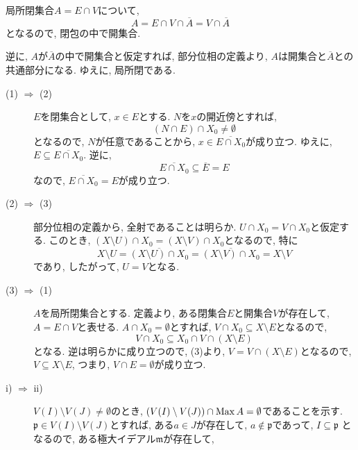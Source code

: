 \documentclass[dvipdfmx]{jsarticle}
\begin{document}
    \begin{problem}
        局所閉集合$A = E \cap V$について,
        \[
            A = E \cap V \cap \overline{A} = V \cap \overline{A}
        \]
        となるので, 閉包の中で開集合.

        逆に, $A$が$\overline{A}$の中で開集合と仮定すれば, 部分位相の定義より, $A$は開集合と$\overline{A}$との共通部分になる.
        ゆえに, 局所閉である.
        \begin{description}
            \item[(1) $\Rightarrow$ (2)]
            $E$を閉集合として, $x \in E$とする.
            $N$を$x$の開近傍とすれば,
            \[
                (N \cap E) \cap X_0 \neq \emptyset
            \]
            となるので, $N$が任意であることから,
            $x \in \overline{E \cap X_0}$が成り立つ.
            ゆえに, $E \subseteq \overline{E \cap X_0}$.
            逆に,
            \[
                \overline{E \cap X_0} \subseteq \overline{E} = E
            \]
            なので, $\overline{E \cap X_0} = E$が成り立つ.
            \item [(2) $\Rightarrow$ (3)]
            部分位相の定義から, 全射であることは明らか.
            $U \cap X_0 = V \cap X_0$と仮定する.
            このとき,
            $(X \setminus U) \cap X_0 = (X \setminus V) \cap X_0$となるので,
            特に
            \[
                X \setminus U = \overline{(X \setminus U) \cap X_0} = \overline{(X \setminus V) \cap X_0} = X \setminus V
            \]
            であり,
            したがって, $U = V$となる.
            \item [(3) $\Rightarrow$ (1)]
            $A$を局所閉集合とする.
            定義より, ある閉集合$E$と開集合$V$が存在して, $A = E \cap V$と表せる.
            $A \cap X_0 = \emptyset$とすれば,
            $V \cap X_0 \subseteq X \setminus E$となるので,
            \[
                V \cap X_0 \subseteq X_0 \cap V \cap (X \setminus E)
            \]
            となる.
            逆は明らかに成り立つので,
            (3)より, $V = V \cap (X \setminus E)$となるので,
            $V \subseteq X \setminus E$, つまり, $V \cap E = \emptyset$が成り立つ.
            \item [i) $\Rightarrow$ ii)]
            $V(I) \setminus V(J) \neq \emptyset$のとき,
            $(V(I) \setminus V(J)) \cap \operatorname{Max}{A} = \emptyset$であることを示す.
            $\mathfrak{p} \in V(I) \setminus V(J)$とすれば, ある$a \in J$が存在して, $a \notin \mathfrak{p}$であって, $I \subseteq \mathfrak{p}$
            となるので, ある極大イデアル$\mathfrak{m}$が存在して,

\end{description}
\end{problem}
\end{document}
